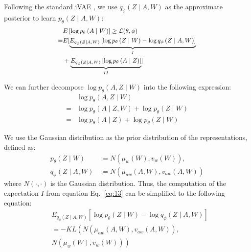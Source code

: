 \documentclass[sigconf]{acmart}
\begin{document}
Following the standard iVAE \cite{9},  we use $q_\phi\left({Z} \mid {A}, {W}\right)$  as the approximate posterior to learn $p_\theta\left({Z} \mid {A}, {W}\right)$:
\begin{equation}
\label{eq:13}
\small
\begin{split}
& E\left[\log p_\theta\left({A} \mid {W}\right)\right] \geq \mathcal{L}(\theta, \phi) \\
= & E[\underbrace{E_{q_\phi\left({Z} \mid {A}, {W}\right)}\left[\log p_\theta\left({Z} \mid {W}\right)-\log q_\phi\left({Z} \mid {A}, {W}\right)\right]}_I \\
& +\underbrace{E_{q_\phi\left({Z} \mid {A}, {W}\right)}\left[\log p_\theta\left({A} \mid {Z}\right)\right]}_{I I}]
\end{split}
\end{equation}


We can further decompose $\log p_\theta\left({A}, {Z} \mid {W}\right)$ into the following expression:
\begin{equation}
\begin{split}
&\log p_\theta\left({A}, {Z} \mid {W}\right)  \\=&\log p_\theta\left({A} \mid {Z}, {W}\right)+\log p_\theta\left({Z} \mid {W}\right) \\=&\log p_\theta\left({A} \mid {Z}\right)+\log p_\theta\left({Z} \mid {W}\right) 
\end{split}
\end{equation}



We use the Gaussian distribution as the prior distribution of the representations, defined as:
\begin{equation}
\begin{split}
p_\theta\left({Z} \mid {W}\right) & :=N\left(\mu_w\left({W}\right), v_w\left({W}\right)\right), \\
q_\phi\left({Z} \mid {A}, {W}\right) & := N\left(\mu_{a w}\left({A}, {W}\right), v_{a w}\left({A}, {W}\right)\right)
\end{split}
\end{equation}
where $N(\cdot, \cdot)$ is the Gaussian distribution. 
Thus, the computation of the expectation \(I\) from equation Eq.~\eqref{eq:13} can be simplified to the following equation:
\begin{equation}
\begin{aligned}
& E_{q_\phi\left({Z} \mid {A}, {W}\right)}\left[\log p_\theta\left({Z} \mid {W}\right) - \log q_\phi\left({Z} \mid {A}, {W}\right)\right] \\
&= -KL\left(N\left(\mu_{aw}\left({A}, {W}\right), v_{aw}\left({A}, {W}\right)\right), \right. \\
& \left. N\left(\mu_w\left({W}\right), v_w\left({W}\right)\right)\right)
\end{aligned}
\end{equation}
\end{document}
